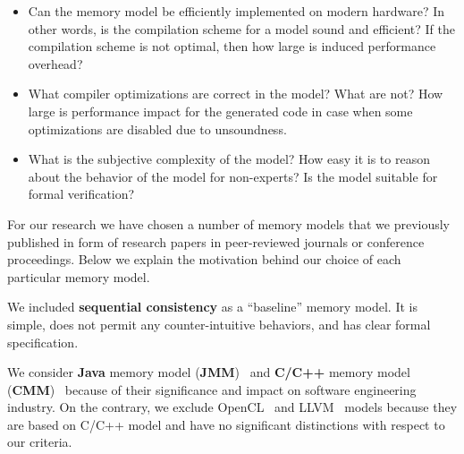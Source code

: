 \documentclass[a4paper,twoside,11pt]{article}
\numberwithin{equation}{section}
\begin{document}
\begin{itemize}
  
  \item Can the memory model be efficiently implemented on modern hardware? 
    In other words, is the compilation scheme for a model sound and efficient?
    If the compilation scheme is not optimal, then how large is induced performance overhead?

  \item What compiler optimizations are correct in the model? What are not? 
    How large is performance impact for the generated code in case when 
    some optimizations are disabled due to unsoundness.

  \item What is the subjective complexity of the model?
    How easy it is to reason about the behavior of the model for non-experts?
    Is the model suitable for formal verification?
  
\end{itemize}

For our research we have chosen a number of memory models 
that we previously published 
in form of research papers in peer-reviewed journals or conference proceedings. 
Below we explain the motivation behind our choice of each particular memory model.  




We included \textbf{sequential consistency} as a ``baseline'' memory model. 
It is simple, does not permit any counter-intuitive behaviors,
and has clear formal specification. 

We consider \textbf{Java} memory model (\textbf{JMM})~\cite{Manson-al:POPL05}
and \textbf{C/C++} memory model (\textbf{CMM})~\cite{Boehm-Adve:PLDI08, Batty-al:POPL11}
because of their significance and impact on software engineering industry.
On the contrary, we exclude OpenCL~\cite{Batty-el:POPL16}
and LLVM~\cite{Chakraborty-Vafeiadis:CGO17}
models because they are based on C/C++ model and have no significant distinctions
with respect to our criteria.
\end{document}
